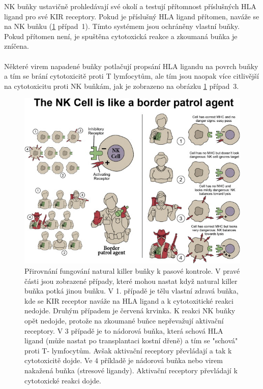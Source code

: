 \documentclass[czech,DP]{thesiskiv}
\numberwithin{equation}{section}
\begin{document}
\noindent
NK buňky ustavičně prohledávají své okolí a testují přítomnost příslušných HLA ligand pro své KIR receptory. Pokud je příslušný HLA ligand přítomen, naváže se na NK buňku (\ref{fig:kir_princip} případ~1). Tímto systémem jsou ochráněny vlastní buňky. Pokud přítomen není, je spuštěna cytotoxická reakce a zkoumaná buňka je zníčena.
\\
\\
Některé virem napadené buňky potlačují propsání HLA ligandu na povrch buňky a tím se brání cytotoxicitě proti T lymfocytům, ale tím jsou naopak více citlivější na cytotoxicitu proti NK buňkám, jak je zobrazeno na obrázku \ref{fig:kir_princip} případ~3.
\begin{figure}[H]		
		\centering
		\includegraphics[width=\textwidth]{./img/NK_princip.jpg}
		\caption{Přirovnání fungování natural killer buňky k pasové kontrole. V pravé části jsou zobrazené případy, které mohou nastat když natural killer buňka potká jinou buňku. V 1. případě je tělu vlastní zdravá buňka, kde se KIR receptor naváže na HLA ligand a k cytotoxitické reakci nedojde. Druhým případem je červená krvinka. K reakci NK buňky opět nedojde, protože na zkoumané buňce nepřevažují aktivační receptory. V 3 případě je to nádorová buňka, která schová HLA ligand (může nastat po transplantaci kostní dřeně) a tím se "schová" proti T- lymfocytům. Avšak aktivační receptory převládají a tak k cytotoxicitě dojde. Ve 4 příkladě je nádorová buňka nebo virem nakažená buňka (stresové ligandy). Aktivační receptory převládají k cytotoxické reakci dojde.\cite{KIR_img_princip}}
		\label{fig:kir_princip}
\end{figure}
\end{document}
